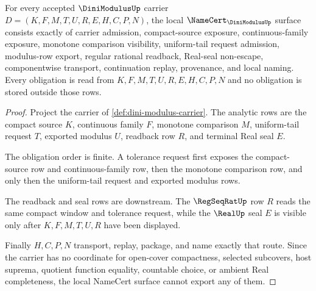 \begin{theorem}
\label{thm:dini-modulus-namecert-obligations}
For every accepted $\DiniModulusUp$ carrier $D=(K,F,M,T,U,R,E,H,C,P,N)$, the local $\NameCert_{\DiniModulusUp}$ surface consists exactly of carrier admission, compact-source exposure, continuous-family exposure, monotone comparison visibility, uniform-tail request admission, modulus-row export, regular rational readback, Real-seal non-escape, componentwise transport, continuation replay, provenance, and local naming. Every obligation is read from $K,F,M,T,U,R,E,H,C,P,N$ and no obligation is stored outside those rows.
\end{theorem}
\begin{proof}
Project the carrier of \autoref{def:dini-modulus-carrier}. The analytic rows are the compact source $K$, continuous family $F$, monotone comparison $M$, uniform-tail request $T$, exported modulus $U$, readback row $R$, and terminal Real seal $E$.

The obligation order is finite. A tolerance request first exposes the compact-source row and continuous-family row, then the monotone comparison row, and only then the uniform-tail request and exported modulus rows.

The readback and seal rows are downstream. The $\RegSeqRatUp$ row $R$ reads the same compact window and tolerance request, while the $\RealUp$ seal $E$ is visible only after $K,F,M,T,U,R$ have been displayed.

Finally $H,C,P,N$ transport, replay, package, and name exactly that route. Since the carrier has no coordinate for open-cover compactness, selected subcovers, host suprema, quotient function equality, countable choice, or ambient Real completeness, the local NameCert surface cannot export any of them.
\end{proof}

